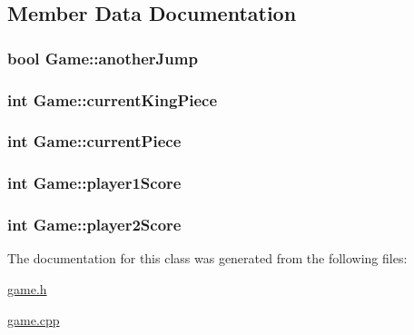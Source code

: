\subsection{Member Data Documentation}
\hypertarget{class_game_aa7bf3272e009587fca6a67b486e27418}{
\subsubsection[{another\-Jump}]{\setlength{\rightskip}{0pt plus 5cm}bool Game\-::another\-Jump}}\label{class_game_aa7bf3272e009587fca6a67b486e27418}
\hypertarget{class_game_af0938fa4b54d37a0c3099397a58d3cd7}{
\subsubsection[{current\-King\-Piece}]{\setlength{\rightskip}{0pt plus 5cm}int Game\-::current\-King\-Piece}}\label{class_game_af0938fa4b54d37a0c3099397a58d3cd7}
\hypertarget{class_game_af6803e417a57dcf56debfd2ecdcc9661}{
\subsubsection[{current\-Piece}]{\setlength{\rightskip}{0pt plus 5cm}int Game\-::current\-Piece}}\label{class_game_af6803e417a57dcf56debfd2ecdcc9661}
\hypertarget{class_game_a54d8c544103d5721e83e75c0fb42a4a3}{
\subsubsection[{player1\-Score}]{\setlength{\rightskip}{0pt plus 5cm}int Game\-::player1\-Score}}\label{class_game_a54d8c544103d5721e83e75c0fb42a4a3}
\hypertarget{class_game_a6ceb54d51da7bfd37492c3ebcea60412}{
\subsubsection[{player2\-Score}]{\setlength{\rightskip}{0pt plus 5cm}int Game\-::player2\-Score}}\label{class_game_a6ceb54d51da7bfd37492c3ebcea60412}


The documentation for this class was generated from the following files\-:\begin{DoxyCompactItemize}
\item 
\hyperlink{game_8h}{game.\-h}\item 
\hyperlink{game_8cpp}{game.\-cpp}\end{DoxyCompactItemize}
